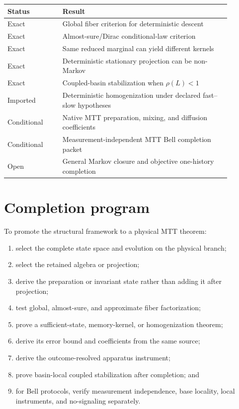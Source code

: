 \documentclass[11pt]{article}
\begin{document}
\begin{center}
\begin{tabular}{p{0.22\linewidth}p{0.67\linewidth}}
\toprule
Status & Result\\
\midrule
Exact & Global fiber criterion for deterministic descent\\
Exact & Almost-sure/Dirac conditional-law criterion\\
Exact & Same reduced marginal can yield different kernels\\
Exact & Deterministic stationary projection can be non-Markov\\
Exact & Coupled-basin stabilization when \(\rho(L)<1\)\\
Imported & Deterministic homogenization under declared fast--slow hypotheses\\
Conditional & Native MTT preparation, mixing, and diffusion coefficients\\
Conditional & Measurement-independent MTT Bell completion packet\\
Open & General Markov closure and objective one-history completion\\
\bottomrule
\end{tabular}
\end{center}

\section{Completion program}

To promote the structural framework to a physical MTT theorem:
\begin{enumerate}
\item select the complete state space and evolution on the physical branch;
\item select the retained algebra or projection;
\item derive the preparation or invariant state rather than adding it after
projection;
\item test global, almost-sure, and approximate fiber factorization;
\item prove a sufficient-state, memory-kernel, or homogenization theorem;
\item derive its error bound and coefficients from the same source;
\item derive the outcome-resolved apparatus instrument;
\item prove basin-local coupled stabilization after completion; and
\item for Bell protocols, verify measurement independence, base locality,
local instruments, and no-signaling separately.
\end{enumerate}
\end{document}
